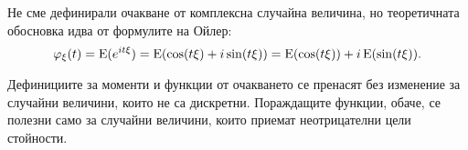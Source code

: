 \documentclass{../../common/topic}
\begin{document}
\begin{remark}
  Не сме дефинирали очакване от комплексна случайна величина, но теоретичната обосновка идва от формулите на Ойлер:
  \begin{equation*}
    \varphi_\xi (t)
    =
    \operatorname{E}(e^{it\xi})
    =
    \operatorname{E}(\cos(t\xi) + i\sin(t\xi))
    =
    \operatorname{E}(\cos(t\xi)) + i \operatorname{E}(\sin(t\xi)).
  \end{equation*}
\end{remark}

\begin{remark}
  Дефинициите за моменти и функции от очакването се пренасят без изменение за случайни величини, които не са дискретни. Пораждащите функции, обаче, се полезни само за случайни величини, които приемат неотрицателни цели стойности.
\end{remark}
\end{document}
